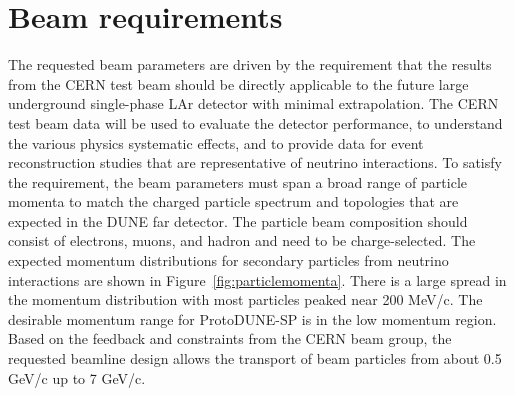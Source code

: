 \section{Beam requirements}
\label{sec:beamrequirements}

The requested beam parameters are driven by the requirement that the results from the CERN test beam should be directly applicable to the future large underground single-phase LAr detector with minimal extrapolation. The CERN test beam data will be used to evaluate the detector performance, to understand the various physics systematic effects, and to provide data for event reconstruction studies that are representative of neutrino interactions. To satisfy the requirement, the beam parameters must span a broad range of particle momenta to match the charged particle spectrum and topologies that are expected in the DUNE far detector. The particle beam composition should consist of electrons, muons, and hadron and need to be charge-selected. The expected momentum distributions for secondary particles from neutrino interactions are shown in Figure~\ref{fig:particlemomenta}. There is a large spread in the momentum distribution with most particles peaked near 200 MeV/c.  
The desirable momentum range for ProtoDUNE-SP  is in the low momentum region. Based on the feedback and constraints from the CERN beam group, the requested beamline design allows the transport of beam particles from about 0.5 GeV/c up to 7 GeV/c. 

